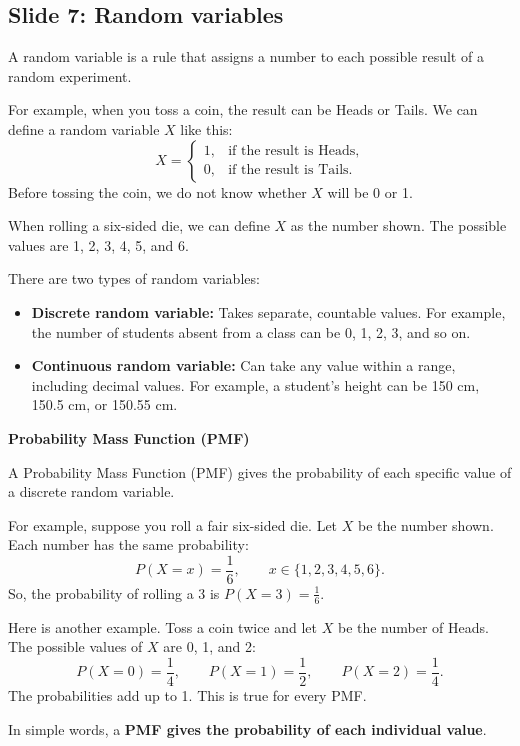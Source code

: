 \subsection*{Slide 7: Random variables}

A random variable is a rule that assigns a number to each possible result of a random experiment.

For example, when you toss a coin, the result can be Heads or Tails. We can define a random variable \(X\) like this:
\[
X =
\begin{cases}
1, & \text{if the result is Heads},\\
0, & \text{if the result is Tails}.
\end{cases}
\]
Before tossing the coin, we do not know whether \(X\) will be 0 or 1.

When rolling a six-sided die, we can define \(X\) as the number shown. The possible values are 1, 2, 3, 4, 5, and 6.

There are two types of random variables:
\begin{itemize}[leftmargin=*]
    \item \textbf{Discrete random variable:} Takes separate, countable values. For example, the number of students absent from a class can be 0, 1, 2, 3, and so on.
    \item \textbf{Continuous random variable:} Can take any value within a range, including decimal values. For example, a student's height can be 150 cm, 150.5 cm, or 150.55 cm.
\end{itemize}

\textbf{Probability Mass Function (PMF)}

A Probability Mass Function (PMF) gives the probability of each specific value of a discrete random variable.

For example, suppose you roll a fair six-sided die. Let \(X\) be the number shown. Each number has the same probability:
\[
P(X=x)=\frac{1}{6}, \qquad x \in \{1,2,3,4,5,6\}.
\]
So, the probability of rolling a 3 is \(P(X=3)=\frac{1}{6}\).

Here is another example. Toss a coin twice and let \(X\) be the number of Heads. The possible values of \(X\) are 0, 1, and 2:
\[
P(X=0)=\frac{1}{4}, \qquad
P(X=1)=\frac{1}{2}, \qquad
P(X=2)=\frac{1}{4}.
\]
The probabilities add up to 1. This is true for every PMF.

In simple words, a \textbf{PMF gives the probability of each individual value}.

